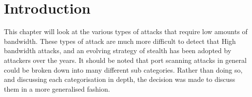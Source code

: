 
\section*{Introduction}
This chapter will look at the various types of attacks that require low amounts of bandwidth. These types of attack are much more difficult to detect that High bandwidth attacks, and an evolving strategy of stealth has been adopted by attackers over the years. It should be noted that port scanning attacks in general could be broken down into many different sub categories. Rather than doing so, and discussing each categorisation in depth, the decision was made to discuss them in a more generalised fashion. 